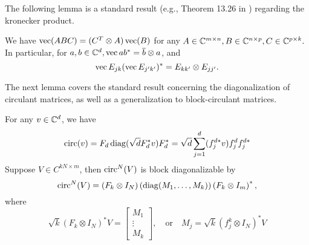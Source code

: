 The following lemma is a standard result (e.g., Theorem 13.26 in \cite{laub2004matrix}) regarding the kronecker product.

\begin{lemma}\label{lem:kronvec}
  We have $\operatorname{vec}(A B C) = (C^T \otimes A) \operatorname{vec}(B)$ for any $A \in \mathbb{C}^{m \times n}, B \in \mathbb{C}^{n \times p}, C \in \mathbb{C}^{p \times k}.$  In particular, for $a, b \in \mathbb{C}^d, \operatorname{vec} a b^* = \overline{b} \otimes a$, and \begin{equation}\label{id:kronsimp} \operatorname{vec} E_{jk} (\operatorname{vec} E_{j' k'})^* = E_{k k'} \otimes E_{j j'}. \end{equation}
\end{lemma}
The next lemma covers the standard result concerning the diagonalization of circulant matrices, as well as a generalization to block-circulant matrices.
\begin{lemma}
  For any $v \in \mathbb{C}^d$, we have \begin{equation} \operatorname{circ}(v) = F_d \operatorname{diag}(\sqrt{d} F_d^* v) F_d^* = \sqrt{d} \sum_{j = 1}^d (f_j^{d *} v) f_j^d f_j^{d *} \label{eq:circ_dft_diag} \end{equation}
  Suppose $V \in C^{k N \times m}$, then $\operatorname{circ}^N(V)$ is block diagonalizable by \begin{equation} \operatorname{circ}^N(V) = \left(F_k \otimes I_N\right) \left(\operatorname{diag}(M_1, \ldots, M_k)\right) \left(F_k \otimes I_m\right)^*,  \label{eq:circ_dft_blk} \end{equation} where \begin{equation} \sqrt{k}\left(F_k \otimes I_N\right)^* V = \begin{bmatrix} M_1 \\ \vdots \\ M_k \end{bmatrix}, \quad \text{or} \quad M_j = \sqrt{k} (f_j^k \otimes I_N)^* V \label{eq:M_ell}\end{equation} \label{lem:circ_diag}
\end{lemma}

